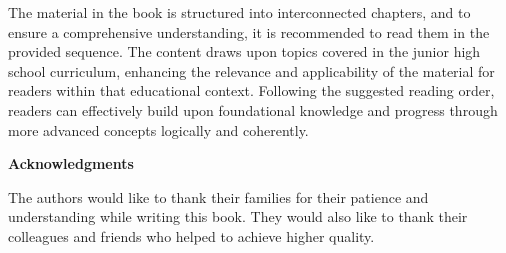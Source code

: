 The material in the book is structured into interconnected chapters, and to ensure a comprehensive understanding, it is recommended to read them in the provided sequence. The content draws upon topics covered in the junior high school curriculum, enhancing the relevance and applicability of the material for readers within that educational context. Following the suggested reading order, readers can effectively build upon foundational knowledge and progress through more advanced concepts logically and coherently.

\vspace{0.5cm}

\large{\textbf{Acknowledgments}}

\vspace{0.5cm}

The authors would like to thank their families for their patience and understanding while writing this book. They would also like to thank their colleagues and friends who helped to achieve higher quality.

